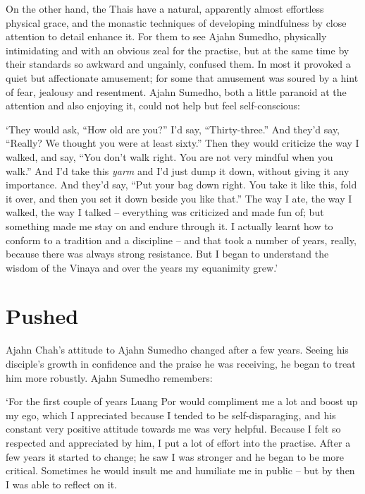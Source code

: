 On the other hand, the Thais have a natural, apparently almost
effortless physical grace, and the monastic techniques of developing
mindfulness by close attention to detail enhance it. For them to see
Ajahn Sumedho, physically intimidating and with an obvious zeal for
the practise, but at the same time by their standards so awkward and
ungainly, confused them. In most it provoked a quiet but affectionate
amusement; for some that amusement was soured by a hint of fear, 
jealousy and resentment. Ajahn Sumedho, both a little paranoid at the
attention and also enjoying it, could not help but feel self-conscious: 

`They would ask, ``How old are you?'' I'd say, ``Thirty-three.'' And
they'd say, ``Really? We thought you were at least sixty.'' Then they
would criticize the way I walked, and say, ``You don't walk right. You
are not very mindful when you walk.'' And I'd take this \emph{yarm} and
I'd just dump it down, without giving it any importance. And they'd say, 
``Put your bag down right. You take it like this, fold it over, and then
you set it down beside you like that.'' The way I ate, the way I walked, 
the way I talked -- everything was criticized and made fun of; but
something made me stay on and endure through it. I actually learnt how
to conform to a tradition and a discipline -- and that took a number of
years, really, because there was always strong resistance. But I began
to understand the wisdom of the Vinaya and over the years my equanimity
grew.'

\section{Pushed}

Ajahn Chah's attitude to Ajahn Sumedho changed after a few years. Seeing
his disciple's growth in confidence and the praise he was receiving, he
began to treat him more robustly. Ajahn Sumedho remembers: 

`For the first couple of years Luang Por would compliment me a lot and
boost up my ego, which I appreciated because I tended to be
self-disparaging, and his constant very positive attitude towards me was
very helpful. Because I felt so respected and appreciated by him, I put
a lot of effort into the practise. After a few years it started to
change; he saw I was stronger and he began to be more critical. 
Sometimes he would insult me and humiliate me in public -- but by then
I was able to reflect on it. 

